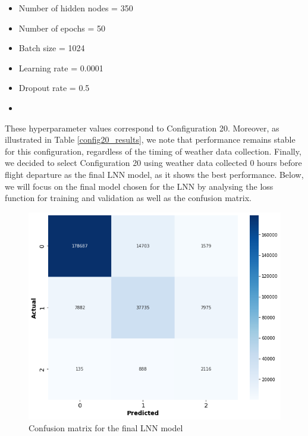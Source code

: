 \documentclass[12pt,oneside]{book} %
\begin{document}
\begin{multicols}{2}
    \begin{itemize}
        \item Number of hidden nodes = 350
        \item Number of epochs = 50
        \item Batch size = 1024
    \end{itemize}
    \begin{itemize}
         \item Learning rate = 0.0001
         \item Dropout rate  = 0.5
         \item[\hspace{0pt}]
    \end{itemize}
\end{multicols}
\noindent These hyperparameter values correspond to Configuration 20. Moreover, as illustrated in Table \ref{config20_results}, we note that performance remains stable for this configuration, regardless of the timing of weather data collection. Finally, we decided to select Configuration 20 using weather data collected 0 hours before flight departure as the final LNN model, as it shows the best performance. Below, we will focus on the final model chosen for the LNN by analysing the loss function for training and validation as well as the confusion matrix.

\begin{figure}[H]
    \centering
    \includegraphics[width=0.73\linewidth]{Image/Confusionmatrix_LNN.png}
    \caption{\centering Confusion matrix for the final LNN model}
    \label{fig:Confusionmatrix_LNN}
\end{figure}
\end{document}
